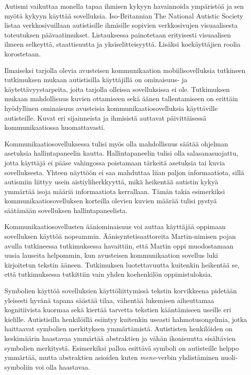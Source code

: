 \documentclass[utf8]{gradu3}
\begin{document}
\label{AAC-staticity}
Autismi vaikuttaa monella tapaa ihmisen kykyyn havainnoida ympäristöä ja sen myötä kykyyn käyttää sovelluksia. Iso-Britannian The National Autistic Society listaa verkkosivuillaan \parencite[]{autism-friendly-websites} autistisille ihmisille sopivien verkkosivujen visuaalisesta toteutuksen päävaatimukset. Listauksessa painotetaan erityisesti visuaalisen ilmeen selkeyttä, staattisuutta ja yksiselitteisyyttä. Lisäksi koekäyttäjien roolia korostetaan.

Ilmaiseksi tarjolla olevia avusteisen kommunikaation mobiilisovelluksia tutkineen tutkimuksen \parencite[]{autism-mobile-usability} mukaan autistisilla käyttäjillä on ominaisuus- ja käytettävyystarpeita, joita tarjolla olleissa sovelluksissa ei ole. Tutkimuksen mukaan mahdollisuus kuvien ottamiseen sekä äänen tallentamiseen on erittäin hyödyllinen ominaisuus avusteisia kommunikaatiosovelluksia käyttäville autisteille. Kuvat eri sijainneista ja ihmisistä auttavat päivittäisessä kommunikaatiossa huomattavasti. \label{AAC-photos}

\label{AAC-settings}
Kommunikaatiosovelluksessa tulisi myös olla mahdollisuus säätää ohjelman asetuksia hallintapaneelin kautta. Hallintapaneelin tulisi olla salasanasuojattu, jotta käyttäjä ei pääse vahingossa poistamaan tärkeitä asetuksia tai kuvia sovelluksesta. Yhteen näyttöön ei saa mahduttaa liian paljon informaatiota, sillä autismiin liittyy usein aistiyliherkkyyttä, mikä heikentää autistin kykyä ymmärtää isoja määriä informaatiota kerrallaan. Tämän takia esimerkiksi kommunikaatiosovelluksen korteilla olevien kuvien määrää tulisi pystyä säätämään sovelluksen hallintapaneelista. \label{AAC-cardsize}

\label{AAC-soundsynth}
Kommunikaatiosovellusten ääniominaisuus voi auttaa käyttäjää oppimaan sovelluksen käyttöä nopeammin. Äänisyntetisaattoreita Martin-nimisen pojan avulla tutkineessa tutkimuksessa \parencite[]{voca-efficacy} havaittiin, että Martin oppi muodostamaan uusia lauseita helpommin, kun avusteisen kommunikaation sovellus luki kirjoitetun tekstin ääneen. Tutkimuksen luotettavuutta kuitenkin heikentää se, että tutkimuksessa tutkittiin vain yhden koehenkilön oppimistuloksia.

\label{symbol-libraries}
Symbolien käyttöä sovelluksien käyttöliittymissä tekstin korvikkeena pidetään yleisesti hyvänä tapana säästää tilaa, vähentää lukemisen aiheuttamaa kognitiivista kuormaa sekä kiertää tarvetta tekstien kääntämiseen useille eri kielille. Autistisilla henkilöillä esiintyy kuitenkin useasti hahmotusongelmia, jotka haittaavat symbolien merkityksen ymmärtämistä. Autististen henkilöiden on keskimäärin haastavaa ymmärtää abstraktien ja vähän ikonisuutta sisältävien symbolien merkitystä. \label{AAC-abstract-symbols} Esimerkiksi palloa esittävä symboli on autisteille helppo ymmärtää, mutta abstraktien asioiden kuten \textit{mene}-verbin yhdistäminen nuoli-symboliin voi olla haastavaa. \parencite[]{symbol-acquisition-autism}
\end{document}

